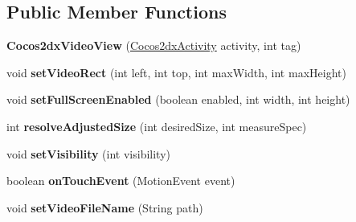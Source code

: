 \subsection*{Public Member Functions}
\begin{DoxyCompactItemize}
\item 
\mbox{\label{classorg_1_1cocos2dx_1_1lib_1_1Cocos2dxVideoView_a0f74d463d6f8c72bbb36f79bfcb36347}} 
{\bfseries Cocos2dx\+Video\+View} (\hyperlink{classorg_1_1cocos2dx_1_1lib_1_1Cocos2dxActivity}{Cocos2dx\+Activity} activity, int tag)
\item 
\mbox{\label{classorg_1_1cocos2dx_1_1lib_1_1Cocos2dxVideoView_a87075c6cb8b1488e11056bb949f0c66a}} 
void {\bfseries set\+Video\+Rect} (int left, int top, int max\+Width, int max\+Height)
\item 
\mbox{\label{classorg_1_1cocos2dx_1_1lib_1_1Cocos2dxVideoView_aa7d2189136ed6c6b443bb9191f379db1}} 
void {\bfseries set\+Full\+Screen\+Enabled} (boolean enabled, int width, int height)
\item 
\mbox{\label{classorg_1_1cocos2dx_1_1lib_1_1Cocos2dxVideoView_a9f562f848f19b8fe4c82c1559aa4f91e}} 
int {\bfseries resolve\+Adjusted\+Size} (int desired\+Size, int measure\+Spec)
\item 
\mbox{\label{classorg_1_1cocos2dx_1_1lib_1_1Cocos2dxVideoView_a22d52a259751a4d1be97c1d214915dd7}} 
void {\bfseries set\+Visibility} (int visibility)
\item 
\mbox{\label{classorg_1_1cocos2dx_1_1lib_1_1Cocos2dxVideoView_a2cb7379fc070381be2376eafb89290f1}} 
boolean {\bfseries on\+Touch\+Event} (Motion\+Event event)
\item 
\mbox{\label{classorg_1_1cocos2dx_1_1lib_1_1Cocos2dxVideoView_af89cc84bdf18ef097a6a9ebc74fb7d46}} 
void {\bfseries set\+Video\+File\+Name} (String path)
\item 
\mbox{\label{classorg_1_1cocos2dx_1_1lib_1_1Cocos2dxVideoView_abe7af1366202168d4f1c77a37438e70d}} 

\end{DoxyCompactItemize}
